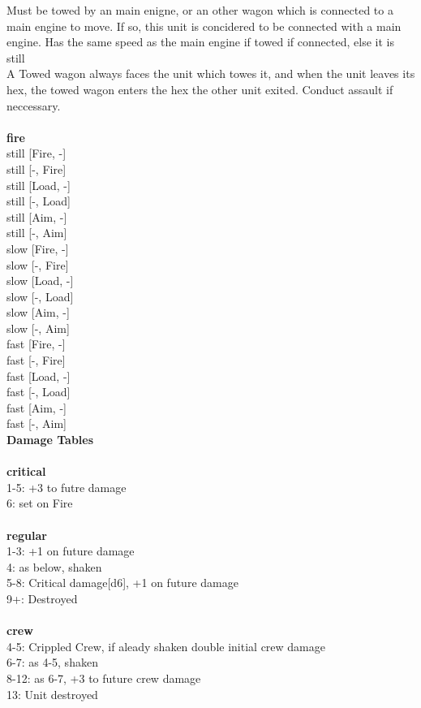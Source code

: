 \noindent Must be towed by an main enigne, or an other wagon which is connected to a main engine to move. If so, this unit is concidered to be connected with a main engine. Has the same speed as the main engine if towed if connected, else it is still\\ 
A Towed wagon always faces the unit which towes it, and when the unit leaves its hex, the towed wagon enters the hex the other unit exited. Conduct assault if neccessary.\\ 


\ \\ {\bf fire } \\
still [Fire, -] \\
still [-, Fire] \\
still [Load, -] \\
still [-, Load] \\
still [Aim, -] \\
still [-, Aim] \\
slow [Fire, -] \\
slow [-, Fire] \\
slow [Load, -] \\
slow [-, Load] \\
slow [Aim, -] \\
slow [-, Aim] \\
fast [Fire, -] \\
fast [-, Fire] \\
fast [Load, -] \\
fast [-, Load] \\
fast [Aim, -] \\
fast [-, Aim] \\


{\bf Damage Tables} \\
\ \\ {\bf critical } \\
1-5: +3 to futre damage \\
6: set on Fire \\
\ \\ {\bf regular } \\
1-3: +1 on future damage \\
4: as below, shaken \\
5-8: Critical damage[d6], +1 on future damage \\
9+: Destroyed \\
\ \\ {\bf crew } \\
4-5: Crippled Crew, if aleady shaken double initial crew damage \\
6-7: as 4-5, shaken \\
8-12: as 6-7, +3 to future crew damage \\
13: Unit destroyed \\


